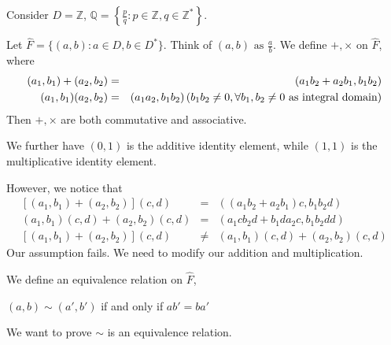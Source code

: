 \documentclass{article}
\theoremstyle{MyNonumberplain}
\theoremstyle{break}
\theoremstyle{break}
\theoremstyle{break}
\theoremstyle{definition}
\theoremstyle{break}
\begin{document}
Consider $D =\mathbb{Z}$, $\mathbb{Q}= \left\{ \frac{p}{q} : p \in \mathbb{Z},
q \in \mathbb{Z}^{\ast} \right\}$.

Let $\hat{F} = \{ (a, b) : a \in D, b \in D^{\ast} \}$. Think of $(a, b)
\text{ as } \frac{a}{b}$. We define $+, \times$ on $\hat{F}$, where
\begin{eqnarray*}
  (a_1, b_1) + (a_2, b_2) & = & (a_1 b_2 + a_2 b_1, b_1 b_2)\\
  (a_1, b_1) (a_2, b_2) & = & (a_1 a_2, b_1 b_2) \hspace*{\fill} \left( b_1
  b_2 \neq 0, \forall b_1, b_2 \neq 0 \text{ as integral domain} \right)
\end{eqnarray*}
Then $+, \times$ are both commutative and associative.

We further have $(0, 1)$ is the additive identity element, while $(1, 1)$ is
the multiplicative identity element.

However, we notice that
\begin{eqnarray*}
  {}[(a_1, b_1) + (a_2, b_2)] (c, d) & = & ((a_1 b_2 + a_2 b_1) c, b_1 b_2
  d)\\
  (a_1, b_1) (c, d) + (a_2, b_2) (c, d) & = & (a_1 c b_2 d + b_1 d a_2 c, b_1
  b_2 d d)\\
  {}[(a_1, b_1) + (a_2, b_2)] (c, d) & \neq & (a_1, b_1) (c, d) + (a_2, b_2)
  (c, d)
\end{eqnarray*}
Our assumption fails. We need to modify our addition and multiplication.

We define an equivalence relation on $\hat{F}$,

\begin{center}
    $(a, b) \sim (a', b')$ if and only if $a b' = b a'$
\end{center}

We want to prove $\sim$ is an equivalence relation.
\end{document}
